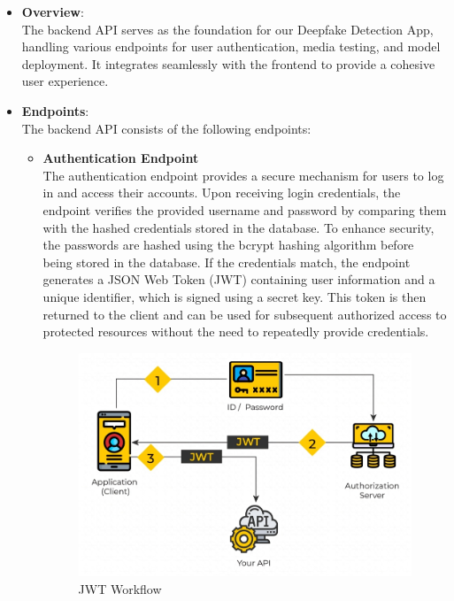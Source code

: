 \begin{itemize}
      \item \textbf{Overview}:\\
            The backend API serves as the foundation for our Deepfake Detection App, handling various endpoints for user authentication, media testing, and model deployment. It integrates seamlessly with the frontend to provide a cohesive user experience.\\

      \item \textbf{Endpoints}:\\
            The backend API consists of the following endpoints:

            \begin{itemize}

                  \item \textbf{Authentication Endpoint}\\
                        The authentication endpoint provides a secure mechanism for users to log in and access their accounts. Upon receiving login credentials, the endpoint verifies the provided username and password by comparing them with the hashed credentials stored in the database. To enhance security, the passwords are hashed using the bcrypt hashing algorithm before being stored in the database. If the credentials match, the endpoint generates a JSON Web Token (JWT) containing user information and a unique identifier, which is signed using a secret key. This token is then returned to the client and can be used for subsequent authorized access to protected resources without the need to repeatedly provide credentials.\\

                        \begin{figure}[htbp]
                              \centering
                              \includegraphics[width=5in]{img/JSON-Web-Tokens-01.png}
                              \caption{JWT Workflow}
                        \end{figure}


\end{itemize}
\end{itemize}

